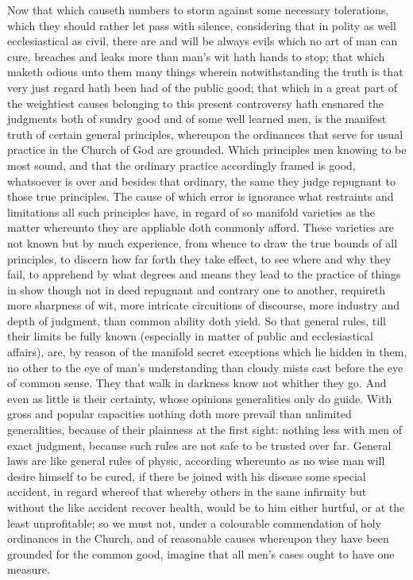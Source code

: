 Now that which causeth numbers to storm against some necessary tolerations, which they should rather let pass with silence, considering that in polity as well ecclesiastical as civil, there are and will be always evils which no art of man can cure, breaches and leaks more than man’s wit hath hands to stop; that which maketh odious unto them many things wherein notwithstanding the truth is that very just regard hath been had of the public good; that which in a great part of the weightiest causes belonging to this present controversy hath ensnared the judgments both of sundry good and of some well learned men, is the manifest truth of certain general principles, whereupon the ordinances that serve for usual practice in the Church of God are grounded. Which principles men knowing to be most sound, and that the ordinary practice accordingly framed is good, whatsoever is over and besides that ordinary, the same they judge repugnant to those true principles. The cause of which error is ignorance what restraints and limitations all such principles have, in regard of so manifold varieties as the matter whereunto they are appliable doth commonly afford. These varieties are not known but by much experience, from whence to draw the true bounds of all principles, to discern how far forth they take effect, to see where and why they fail, to apprehend by what degrees and means they lead to the practice of things in show though not in deed repugnant and contrary one to another, requireth more sharpness of wit, more intricate circuitions of discourse, more industry and depth of judgment, than common ability doth yield. So that general rules, till their limits be fully known (especially in matter of public and ecclesiastical affairs), are, by reason of the manifold secret exceptions which lie hidden in them, no other to the eye of man’s understanding than cloudy mists cast before the eye of common sense. They that walk in darkness know not  whither they go. And even as little is their certainty, whose opinions generalities only do guide. With gross and popular capacities nothing doth more prevail than unlimited generalities, because of their plainness at the first sight: nothing less with men of exact judgment, because such rules are not safe to be trusted over far. General laws are like general rules of physic, according whereunto as no wise man will desire himself to be cured, if there be joined with his disease some special accident, in regard whereof that whereby others in the same infirmity but without the like accident recover health, would be to him either hurtful, or at the least unprofitable; so we must not, under a colourable commendation of holy ordinances in the Church, and of reasonable causes whereupon they have been grounded for the common good, imagine that all men’s cases ought to have one measure.
